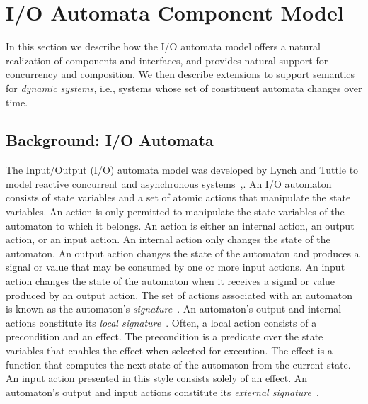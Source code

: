 \section{I/O Automata Component Model\label{component_model}}


In this section we describe how the I/O automata model offers a natural realization of components and interfaces, and provides natural support for concurrency and composition.
We then describe extensions to support semantics for \emph{dynamic systems,} i.e., systems whose set of constituent automata changes over time.

\subsection{Background: I/O Automata}

The Input/Output (I/O) automata model was developed by Lynch and Tuttle to model reactive concurrent and asynchronous systems~\cite{lynch1987hierarchical},\cite{lynch1996distributed}.
An I/O automaton consists of state variables and a set of atomic actions that manipulate the state variables.
An action is only permitted to manipulate the state variables of the automaton to which it belongs.
An action is either an internal action, an output action, or an input action.
An internal action only changes the state of the automaton.
An output action changes the state of the automaton and produces a signal or value that may be consumed by one or more input actions.
An input action changes the state of the automaton when it receives a signal or value produced by an output action.
\ifjournal
The set of actions associated with an automaton is known as the automaton's \emph{signature}~\cite{lynch1996distributed}.
\fi
An automaton's output and internal actions constitute its \emph{local signature}~\cite{lynch1996distributed}.
\ifjournal
Often, a local action consists of a precondition and an effect.
The precondition is a predicate over the state variables that enables the effect when selected for execution.
The effect is a function that computes the next state of the automaton from the current state.
An input action presented in this style consists solely of an effect.
\fi
An automaton's output and input actions constitute its \emph{external signature}~\cite{lynch1996distributed}.

